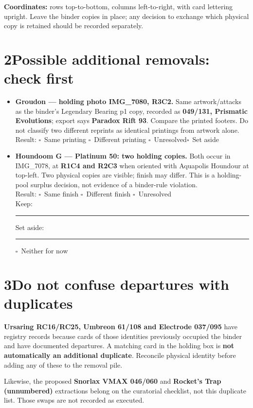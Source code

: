 \documentclass[10pt,a4paper]{article}
\newcommand{\cb}{$\square$}
\begin{document}
\smallskip
\textbf{Coordinates:} rows top-to-bottom, columns left-to-right, with card lettering upright. Leave the binder copies in place; any decision to exchange which physical copy is retained should be recorded separately.

\section{2\quad Possible additional removals: check first}
\begin{itemize}
\item \textbf{Groudon --- holding photo IMG\_7080, R3C2.} Same artwork/attacks as the binder's Legendary Bearing p1 copy, recorded as \textbf{049/131, Prismatic Evolutions}; export says \textbf{Paradox Rift 93}. Compare the printed footers. Do not classify two different reprints as identical printings from artwork alone.\\
Result: \cb\ Same printing \quad \cb\ Different printing \quad \cb\ Unresolved\quad \cb\ Set aside
\item \textbf{Houndoom G --- Platinum 50: two holding copies.} Both occur in IMG\_7078, at \textbf{R1C4 and R2C3} when oriented with Aquapolis Houndour at top-left. Two physical copies are visible; finish may differ. This is a holding-pool surplus decision, not evidence of a binder-rule violation.\\
Result: \cb\ Same finish \quad \cb\ Different finish \quad \cb\ Unresolved\\
Keep: \rule{30mm}{0.3pt}\quad Set aside: \rule{30mm}{0.3pt}\quad \cb\ Neither for now
\end{itemize}

\section{3\quad Do not confuse departures with duplicates}
\textbf{Ursaring RC16/RC25, Umbreon 61/108 and Electrode 037/095} have registry records because cards of those identities previously occupied the binder and have documented departures. A matching card in the holding box is \textbf{not automatically an additional duplicate}. Reconcile physical identity before adding any of these to the removal pile.

Likewise, the proposed \textbf{Snorlax VMAX 046/060} and \textbf{Rocket's Trap (unnumbered)} extractions belong on the curatorial checklist, not this duplicate list. Those swaps are not recorded as executed.
\end{document}
